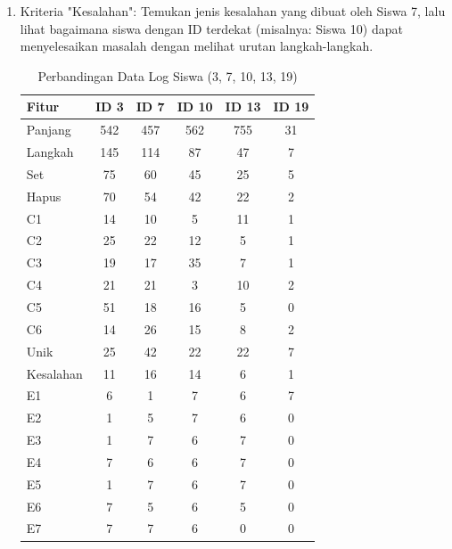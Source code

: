     \begin{enumerate}
        \item Kriteria "Kesalahan": Temukan jenis kesalahan yang dibuat oleh Siswa 7, lalu lihat bagaimana siswa dengan ID terdekat (misalnya: Siswa 10) dapat menyelesaikan masalah dengan melihat urutan langkah-langkah.
            \begin{table}[H]
            \centering
            \caption{Perbandingan Data Log Siswa \citep{Supianto2017} (3, 7, 10, 13, 19)}
            \label{tab:fitur}
            \begin{tabular}{lccccc}
            \toprule
            \textbf{Fitur} & \textbf{ID 3} & \textbf{ID 7} & \textbf{ID 10} & \textbf{ID 13} & \textbf{ID 19} \\
            \midrule
            Panjang     & 542 & 457 & 562 & 755 & 31 \\
            Langkah     & 145 & 114 & 87  & 47  & 7  \\
            Set         & 75  & 60  & 45  & 25  & 5  \\
            Hapus       & 70  & 54  & 42  & 22  & 2  \\
            C1          & 14  & 10  & 5   & 11  & 1  \\
            C2          & 25  & 22  & 12  & 5   & 1  \\
            C3          & 19  & 17  & 35  & 7   & 1  \\
            C4          & 21  & 21  & 3   & 10  & 2  \\
            C5          & 51  & 18  & 16  & 5   & 0  \\
            C6          & 14  & 26  & 15  & 8   & 2  \\
            Unik        & 25  & 42  & 22  & 22  & 7  \\
            Kesalahan   & 11  & 16  & 14  & 6   & 1  \\
            E1          & 6   & 1   & 7   & 6   & 7  \\
            E2          & 1   & 5   & 7   & 6   & 0  \\
            E3          & 1   & 7   & 6   & 7   & 0  \\
            E4          & 7   & 6   & 6   & 7   & 0  \\
            E5          & 1   & 7   & 6   & 7   & 0  \\
            E6          & 7   & 5   & 6   & 5   & 0  \\
            E7          & 7   & 7   & 6   & 0   & 0  \\

\end{tabular}
\end{table}
\end{enumerate}
